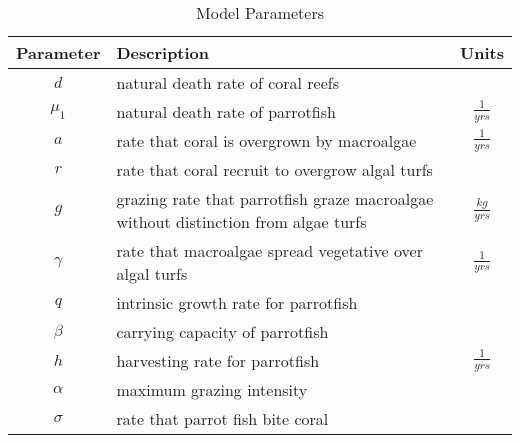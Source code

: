 \documentclass[12pt]{article}
\begin{document}
\begin{table}[H]
    \centering
    \begin{tabular}{c p{9cm} c}
        \hline
        Parameter & Description & Units  \\
        \hline
        \hline
        $d$ & natural death rate of coral reefs & \\
        $\mu_{1}$ & natural death rate of parrotfish & $\frac{1}{yrs}$\cite{12_noaa_report}\\
        $a$ & rate that coral is overgrown by macroalgae & $\frac{1}{yrs}$\\
        $r$ & rate that coral recruit to overgrow algal turfs & \\
        $g$ & grazing rate that parrotfish graze macroalgae without distinction from algae turfs & $\frac{kg}{yrs}$\\
        $\gamma$ & rate that macroalgae spread vegetative over algal turfs & $\frac{1}{yrs}$\\
        $q$ & intrinsic growth rate for parrotfish & \\
        $\beta$ & carrying capacity of parrotfish & \\
        $h$ & harvesting rate for parrotfish & $\frac{1}{yrs}$\cite{12_noaa_report}\\
        $\alpha$ & maximum grazing intensity & \\
        $\sigma$ & rate that parrot fish bite coral & \\
        \hline
    \end{tabular}
    \caption{Model Parameters}
    \label{tab:my_label}
\end{table}

\end{document}
